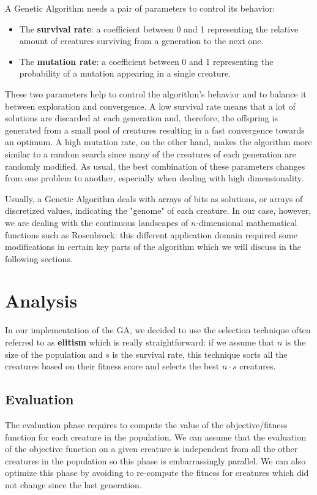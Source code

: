 \documentclass[12pt,a4paper,oneside]{article}
\begin{document}
	A Genetic Algorithm needs a pair of parameters to control its behavior:
	\begin{itemize}
		\item The \textbf{survival rate}: a coefficient between 0 and 1 representing the relative amount of creatures surviving from a generation to the next one.
		\item The \textbf{mutation rate}: a coefficient between 0 and 1 representing the probability of a mutation appearing in a single creature.
	\end{itemize}

	These two parameters help to control the algorithm's behavior and to balance it between exploration and convergence.
	A low survival rate means that a lot of solutions are discarded at each generation and, therefore, the offspring is generated from a small pool of creatures resulting in a fast convergence towards an optimum.
	A high mutation rate, on the other hand, makes the algorithm more similar to a random search since many of the creatures of each generation are randomly modified.
	As usual, the best combination of these parameters changes from one problem to another, especially when dealing with high dimensionality.

	Usually, a Genetic Algorithm deals with arrays of bits as solutions, or arrays of discretized values, indicating the "genome" of each creature. In our case, however, we are dealing with the continuous landscapes of $n$-dimensional mathematical functions such as Rosenbrock: this different application domain required some modifications in certain key parts of the algorithm which we will discuss in the following sections.

	\clearpage
	\section{Analysis}
	In our implementation of the GA, we decided to use the selection technique often referred to as \textbf{elitism} which is really straightforward: if we assume that $n$ is the size of the population and $s$ is the survival rate, this technique sorts all the creatures based on their fitness score and selects the best $n \cdot s$ creatures.

	\subsection{Evaluation}
	\label{analysis:eval}
	The evaluation phase requires to compute the value of the objective/fitness function for each creature in the population. We can assume that the evaluation of the objective function on a given creature is independent from all the other creatures in the population so this phase is embarrassingly parallel.
	We can also optimize this phase by avoiding to re-compute the fitness for creatures which did not change since the last generation.
\end{document}
